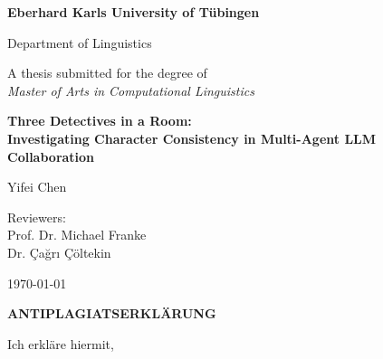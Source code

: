 \documentclass{article}
\newcommand\myemptypage{%
  \null
  \thispagestyle{empty}
  \addtocounter{page}{-1}
  \newpage
}
\begin{document}
\begin{titlepage}
  \centering
  \vspace*{2cm}

  {\Large\bfseries Eberhard Karls University of Tübingen\par}
  \vspace{0.5cm}

  {\large Department of Linguistics\par}
  \vspace{1.5cm}

  {\large A thesis submitted for the degree of\\
  \textit{Master of Arts in Computational Linguistics}\par}
  \vspace{1.5cm}

  {\Large\bfseries Three Detectives in a Room:\\
  Investigating Character Consistency in Multi-Agent LLM Collaboration\par}
  \vspace{1.5cm}

  {\large Yifei Chen\par}
  \vspace{1cm}


  {\normalsize
  Reviewers:\\
  \vspace{0.2cm}
  \large
  Prof. Dr. Michael Franke\\
  Dr. Çağrı Çöltekin\par}
  \vspace{0.5cm}

  {\normalsize \today\par}

  \vfill
\end{titlepage}

\myemptypage



\newpage

\begin{center}
  \normalsize\bfseries\MakeUppercase{Antiplagiatserklärung}
\end{center}

Ich erkläre hiermit,
\end{document}
